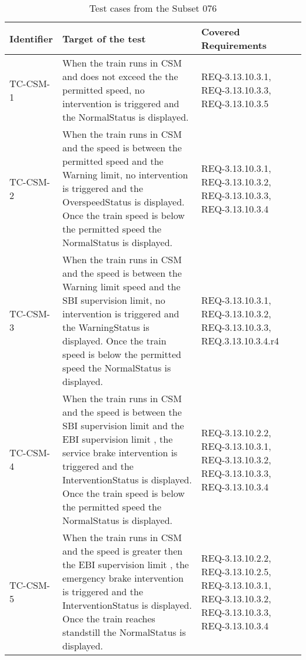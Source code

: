 \begin{table}
\tabsize
\renewcommand{\arraystretch}{1.2}
\caption{Test cases from the Subset 076}
\label{tbl:manualtest}
\begin{tabular}{lp{}p{4.9cm}}
\hline\hline
Identifier & Target of the test & Covered Requirements \\
\hline
TC-CSM-1 & 
When the train runs in CSM  and does not exceed the
the permitted speed, no intervention is triggered and the 
{\sf NormalStatus} is displayed.& 
REQ-3.13.10.3.1, REQ-3.13.10.3.3,\newline
REQ-3.13.10.3.5 \\ \hline
TC-CSM-2 & 
When the train runs in CSM and the speed is between the permitted
speed and the Warning limit, no intervention is triggered and the 
{\sf OverspeedStatus} is displayed. Once the train speed is below 
the permitted speed the {\sf NormalStatus} is displayed. & 
REQ-3.13.10.3.1, REQ-3.13.10.3.2,\newline
REQ-3.13.10.3.3, REQ-3.13.10.3.4 \\ \hline
TC-CSM-3 & 
When the train runs in CSM and the speed is between the Warning limit
speed and the SBI supervision limit, no intervention is triggered and the 
{\sf WarningStatus} is displayed. Once the train speed is below 
the permitted speed the {\sf NormalStatus} is displayed. & 
REQ-3.13.10.3.1, REQ-3.13.10.3.2, \newline
REQ-3.13.10.3.3, REQ.3.13.10.3.4.r4 \\ \hline
TC-CSM-4 & 
When the train runs in CSM and the speed is between the SBI
supervision limit and
the EBI supervision limit , the service brake intervention is triggered and the 
{\sf InterventionStatus} is displayed. Once the train speed is below 
the permitted speed the {\sf NormalStatus} is displayed. & 
REQ-3.13.10.2.2, REQ-3.13.10.3.1,\newline
REQ-3.13.10.3.2, REQ-3.13.10.3.3,\newline 
REQ-3.13.10.3.4 \\ \hline
TC-CSM-5 & 
When the train runs in CSM and the speed is greater then 
the EBI supervision limit , the emergency brake intervention is triggered and the 
{\sf InterventionStatus} is displayed. Once the train reaches
standstill the {\sf NormalStatus} is displayed. & 
REQ-3.13.10.2.2, REQ-3.13.10.2.5, \newline
REQ-3.13.10.3.1, REQ-3.13.10.3.2, \newline
REQ-3.13.10.3.3, REQ-3.13.10.3.4 \\ \hline

\end{tabular}
\end{table}
